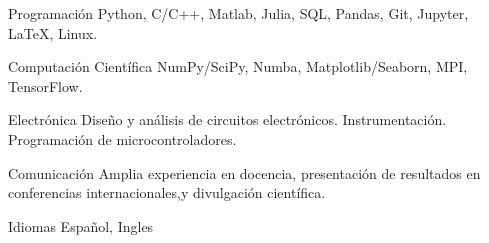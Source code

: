 

\begin{cvskills}

  \cvskill
    {Programación} %
    {Python, C/C++, Matlab, Julia, SQL, Pandas, Git, Jupyter, LaTeX, Linux.} %

  \cvskill
    {Computación Científica} %
    {NumPy/SciPy, Numba, Matplotlib/Seaborn, MPI, TensorFlow.} %

  \cvskill
    {Electrónica} %
    {Diseño y análisis de circuitos electrónicos. Instrumentación. Programación de microcontroladores.} %

  \cvskill
    {Comunicación} %
    {Amplia experiencia en docencia, presentación de resultados en conferencias internacionales,\newline y divulgación científica.} %

  \cvskill
    {Idiomas} %
    {Español, Ingles} %

\end{cvskills}
